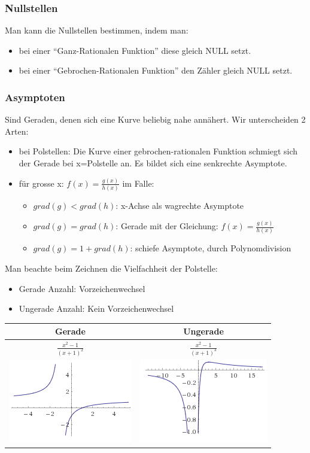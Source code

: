 \subsubsection*{Nullstellen}

Man kann die Nullstellen bestimmen, indem man:
\begin{itemize}
\item bei einer ``Ganz-Rationalen Funktion'' diese gleich NULL setzt.
\item bei einer ``Gebrochen-Rationalen Funktion'' den Zähler gleich NULL
setzt.
\end{itemize}

\subsubsection*{Asymptoten}

Sind Geraden, denen sich eine Kurve beliebig nahe annähert. Wir unterscheiden
2 Arten:
\begin{itemize}
\item bei Polstellen: Die Kurve einer gebrochen-rationalen Funktion schmiegt
sich der Gerade bei x=Polstelle an. Es bildet sich eine senkrechte
Asymptote.
\item für grosse x: $f(x)=\frac{g(x)}{h(x)}$ im Falle:

\begin{itemize}
\item $grad(g)<grad(h)$: x-Achse als wagrechte Asymptote
\item $grad(g)=grad(h)$: Gerade mit der Gleichung: $f(x)=\frac{g(x)}{h(x)}$
\item $grad(g)=1+grad(h)$: schiefe Asymptote, durch Polynomdivision
\end{itemize}
\end{itemize}
Man beachte beim Zeichnen die Vielfachheit der Polstelle:
\begin{itemize}
\item Gerade Anzahl: Vorzeichenwechsel
\item Ungerade Anzahl: Kein Vorzeichenwechsel
\end{itemize}
\begin{tabular}{|c|c|}
\hline 
Gerade & Ungerade\tabularnewline
\hline 
$\frac{x^{2}-1}{(x+1)^{2}}$ & $\frac{x^{2}-1}{(x+1)^{3}}$\tabularnewline
\hline 
\includegraphics{Funktionen/vrzw} & \includegraphics{Funktionen/kvrzw}\tabularnewline
\hline 
\end{tabular}


